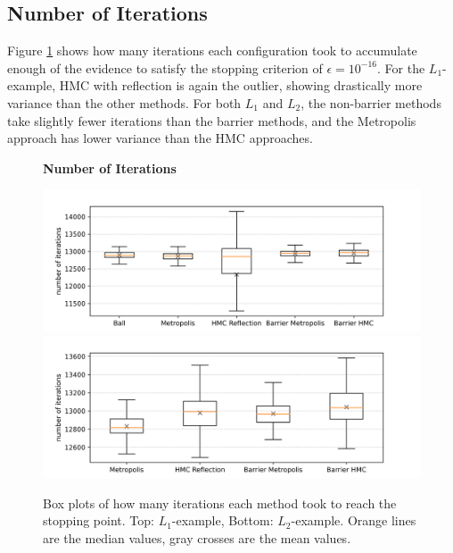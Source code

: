 \documentclass[12pt, a4paper]{report}
\begin{document}
\subsection{Number of Iterations}
Figure \ref{fig:results_iterations} shows how many iterations each configuration took to accumulate enough of the evidence to satisfy the stopping criterion of $\epsilon = 10^{-16}$.
For the $L_1$-example, HMC with reflection is again the outlier, showing drastically more variance than the other methods.
For both $L_1$ and $L_2$, the non-barrier methods take slightly fewer iterations than the barrier methods, and the Metropolis approach has lower variance than the HMC approaches.
\begin{figure}
    \centering
    {\small \textbf{Number of Iterations} \par}
    \includegraphics[scale=0.7]{figs/results/iterations_spike_20d.png}
    \includegraphics[scale=0.7]{figs/results/iterations_spike_offcenter_20d.png}
    \caption{Box plots of how many iterations each method took to reach the stopping point. Top: $L_1$-example, Bottom: $L_2$-example. Orange lines are the median values, gray crosses are the mean values.}
    \label{fig:results_iterations}
\end{figure}
\end{document}
